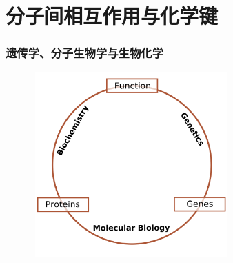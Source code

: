 \small
\section{分子间相互作用与化学键}
%
\frame
{
	\frametitle{遗传学、分子生物学与生物化学}
\begin{figure}[h!]
\centering
\vspace{-5.5pt}
\includegraphics[height=2.80in,width=2.97in,viewport=0 0 720 680,clip]{Figures/Schematic_relationship_between_biochemistry_genetics_and_molecular_biology.png}
\label{Bio-Chem-Genetics}
\end{figure}
}

